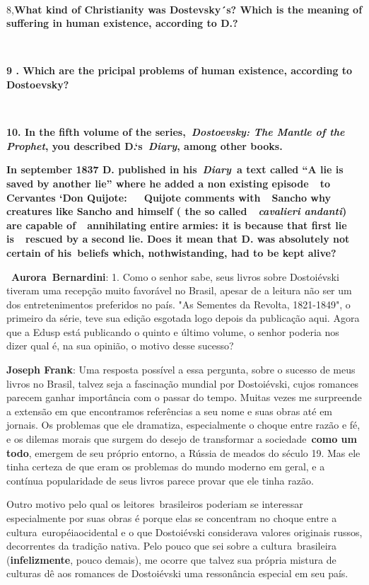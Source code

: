 ~

8,\textbf{What kind of Christianity was Dostevsky´s? Which is the
meaning of suffering in human existence, according to D.?}

\textbf{~}

\textbf{9 . Which are the pricipal problems of human existence,
according to Dostoevsky?}

\textbf{~}

\textbf{10. In the fifth volume of the series,~\emph{Dostoevsky: The
Mantle of the Prophet}, you described D.`s\emph{~Diary}, among other
books.}

\textbf{In september 1837 D. published in his~\emph{Diary}~a text called
``A lie is saved by another lie'' where he added a non existing
episode~~to Cervantes `Don Quijote:~~~Quijote comments with~~Sancho why
creatures like Sancho and himself ( the so called~~\emph{cavalieri
andanti}) are capable of~~annihilating entire armies: it is because that
first lie is~~rescued by a second lie. Does it mean that D. was
absolutely not certain of his~beliefs which, nothwistanding, had to be
kept alive?~~}

~\textbf{Aurora~Bernardini}: 1. Como o senhor sabe, seus livros sobre
Dostoiévski tiveram uma recepção muito favorável no Brasil, apesar de a
leitura não ser um dos entretenimentos preferidos no país. "As Sementes
da Revolta, 1821-1849", o primeiro da série, teve sua edição esgotada
logo depois da publicação aqui. Agora que a Edusp está publicando o
quinto e último volume, o senhor poderia nos dizer qual é, na sua
opinião, o motivo desse sucesso?

\textbf{Joseph Frank}: Uma resposta possível a essa pergunta, sobre o
sucesso de meus livros no Brasil, talvez seja a fascinação mundial por
Dostoiévski, cujos romances parecem ganhar importância com o passar do
tempo. Muitas vezes me surpreende a extensão em que encontramos
referências a seu nome e suas obras até em jornais. Os problemas que ele
dramatiza, especialmente o choque entre razão e fé, e os dilemas morais
que surgem do desejo de transformar a sociedade~\textbf{como um todo},
emergem de seu próprio entorno, a Rússia de meados do século 19. Mas ele
tinha certeza de que eram os problemas do mundo moderno em geral, e a
contínua popularidade de seus livros parece provar que ele tinha razão.

Outro motivo pelo qual os leitores~brasileiros poderiam se interessar
especialmente por suas obras é porque elas se concentram no choque entre
a cultura~européiaocidental e o que Dostoiévski considerava valores
originais russos, decorrentes da tradição nativa. Pelo pouco que sei
sobre a cultura~brasileira (\textbf{infelizmente}, pouco demais), me
ocorre que talvez sua própria mistura de culturas dê aos romances de
Dostoiévski uma ressonância especial em seu país.

